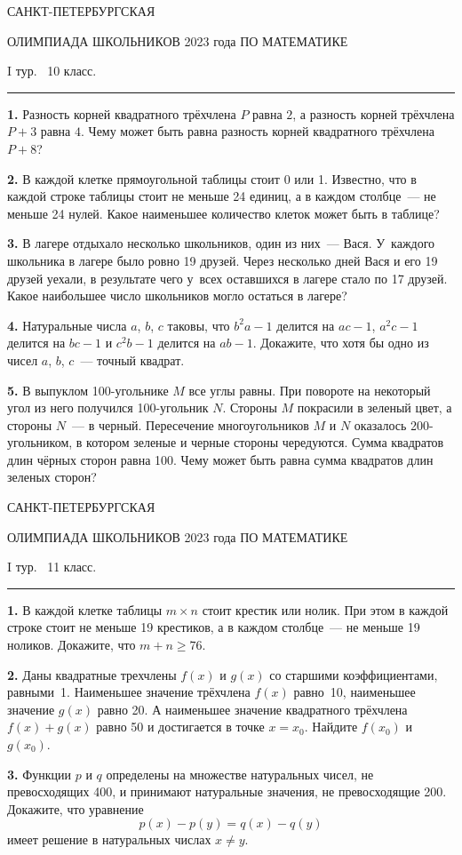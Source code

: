 \documentclass[12pt]{article}
\def\q#1.{{\bf #1. }}
\begin{document}
\clearpage

\centerline{\sc САНКТ-ПЕТЕРБУРГСКАЯ}
\centerline{\sc ОЛИМПИАДА ШКОЛЬНИКОВ 2023 года ПО МАТЕМАТИКЕ}
\centerline{\sc I тур. \ 10 класс.}
\medskip
\hrule
\bigskip

\q1. Разность корней квадратного трёхчлена $P$ равна $2$, а  разность корней трёхчлена $P + 3$ равна $4$. Чему может быть равна разность корней квадратного трёхчлена $P + 8$?

\q2. В каждой клетке прямоугольной таблицы стоит 0 или 1. Известно, что в каждой строке таблицы стоит не меньше 24 единиц, а в каждом столбце~--- не меньше 24 нулей. Какое наименьшее количество клеток может быть в таблице?

\q3. В лагере отдыхало несколько школьников, один из них~--- Вася. У~каждого школьника в лагере было ровно 19 друзей. Через несколько дней Вася и его 19 друзей уехали, в результате чего у~всех оставшихся в лагере стало по 17 друзей. Какое наибольшее число школьников могло остаться в лагере?

\q4. Натуральные числа $a$, $b$, $c$ таковы, что $b^2a - 1$ делится на $ac - 1$, $a^2c - 1$ делится на $bc - 1$ и $c^2b - 1$ делится на $ab - 1$. Докажите, что хотя бы одно из чисел $a$, $b$, $c$~--- точный квадрат.

\q5. В выпуклом 100-угольнике $M$ все углы равны. При повороте на некоторый угол из него получился 100-угольник $N$. Стороны $M$ покрасили в зеленый цвет, а стороны $N$~--- в черный. Пересечение многоугольников $M$ и $N$ оказалось 200-угольником, в котором зеленые и черные стороны чередуются. Сумма квадратов длин чёрных сторон равна 100. Чему может быть равна сумма квадратов длин зеленых сторон?


\clearpage

\centerline{\sc САНКТ-ПЕТЕРБУРГСКАЯ}
\centerline{\sc ОЛИМПИАДА ШКОЛЬНИКОВ 2023 года ПО МАТЕМАТИКЕ}
\centerline{\sc I тур. \ 11 класс.}
\medskip
\hrule
\bigskip

\q1. В каждой клетке таблицы $m\times n$ стоит крестик или нолик. При этом в каждой строке стоит не меньше 19 крестиков, а в каждом столбце~--- не меньше 19 ноликов. Докажите, что $m+n\geq 76$.

\q2. Даны квадратные трехчлены $f(x)$ и $g(x)$ со старшими коэффициентами, равными~1. Наименьшее значение трёхчлена $f(x)$ равно~10, наименьшее значение $g(x)$ равно 20. А наименьшее значение квадратного трёхчлена $f(x)+g(x)$ равно 50 и достигается в точке $x=x_0$. Найдите $f(x_0)$ и $g(x_0)$.

\q3. Функции $p$ и $q$ определены на множестве натуральных чисел, не превосходящих 400, и принимают натуральные значения, не превосходящие 200. Докажите, что уравнение 
$$
p(x)-p(y)=q(x)-q(y)
$$ 
имеет решение в натуральных числах $x\ne y$.
\end{document}
